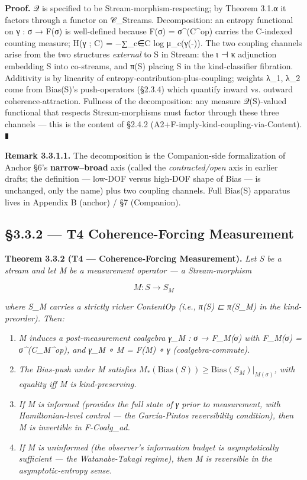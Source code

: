 \documentclass[11pt, openany]{book}
\begin{document}
\textbf{Proof.} 𝒬 is specified to be Stream-morphism-respecting; by Theorem 3.1.α it factors through a functor on 𝒞\_\allowbreak{}Streams. Decomposition: an entropy functional on γ : σ → F(σ) is well-defined because F(σ) = σ\textasciicircum{}(C\textasciicircum{}op) carries the C-indexed counting measure; H(γ ; C) = −∑\_\allowbreak{}c∈C log μ\_\allowbreak{}c(γ(-)). The two coupling channels arise from the two structures \textit{external} to S in Stream: the ι ⊣ κ adjunction embedding S into co-streams, and π(S) placing S in the kind-classifier fibration. Additivity is by linearity of entropy-contribution-plus-coupling; weights λ\_\allowbreak{}1, λ\_\allowbreak{}2 come from Bias(S)'s push-operators (§2.3.4) which quantify inward vs. outward coherence-attraction. Fullness of the decomposition: any measure 𝒬(S)-valued functional that respects Stream-morphisms must factor through these three channels --- this is the content of §2.4.2 (A2+F-imply-kind-coupling-via-Content). ∎

\textbf{Remark 3.3.1.1.} The decomposition is the Companion-side formalization of Anchor §6's \textbf{narrow–broad} axis (called the \textit{contracted/open} axis in earlier drafts; the definition --- low-DOF versus high-DOF shape of Bias --- is unchanged, only the name) plus two coupling channels. Full Bias(S) apparatus lives in Appendix B (anchor) / §7 (Companion).

\subsection{§3.3.2 --- T4 Coherence-Forcing Measurement}

\textbf{Theorem 3.3.2 (T4 --- Coherence-Forcing Measurement).} \textit{Let S be a stream and let M be a measurement operator --- a Stream-morphism}

\[
M : S \to S_M
\]

\textit{where S\_\allowbreak{}M carries a strictly richer ContentOp (i.e., π(S) ⊏ π(S\_\allowbreak{}M) in the kind-preorder). Then:}

\begin{enumerate}
\item \textit{M induces a post-measurement coalgebra γ\_\allowbreak{}M : σ → F\_\allowbreak{}M(σ) with F\_\allowbreak{}M(σ) = σ\textasciicircum{}(C\_\allowbreak{}M\textasciicircum{}op), and γ\_\allowbreak{}M ∘ M = F(M) ∘ γ (coalgebra-commute).}
\item \textit{The Bias-push under M satisfies $M_*(\mathrm{Bias}(S)) \geq \mathrm{Bias}(S_M)|_{M(\sigma)}$, with equality iff M is kind-preserving.}
\item \textit{If M is informed (provides the full state of γ prior to measurement, with Hamiltonian-level control --- the García-Pintos reversibility condition), then M is invertible in F-Coalg\_\allowbreak{}ad.}
\item \textit{If M is uninformed (the observer's information budget is asymptotically sufficient --- the Watanabe-Takagi regime), then M is reversible in the asymptotic-entropy sense.}
\end{enumerate}
\end{document}
